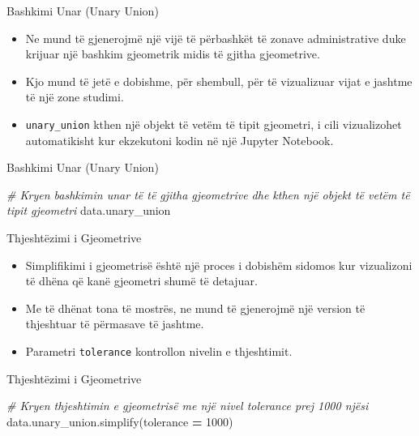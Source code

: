 \documentclass[
  ignorenonframetext,
]{beamer}
\newenvironment{Shaded}{\begin{snugshade}}{\end{snugshade}}
\newcommand{\CommentTok}[1]{\textcolor[rgb]{0.56,0.35,0.01}{\textit{#1}}}
\newcommand{\DecValTok}[1]{\textcolor[rgb]{0.00,0.00,0.81}{#1}}
\newcommand{\NormalTok}[1]{#1}
\newcommand{\OperatorTok}[1]{\textcolor[rgb]{0.81,0.36,0.00}{\textbf{#1}}}
\begin{document}
\begin{frame}[fragile]{Bashkimi Unar (Unary Union)}
\protect\hypertarget{bashkimi-unar-unary-union}{}
\begin{itemize}
\item
  Ne mund të gjenerojmë një vijë të përbashkët të zonave administrative
  duke krijuar një bashkim gjeometrik midis të gjitha gjeometrive.
\item
  Kjo mund të jetë e dobishme, për shembull, për të vizualizuar vijat e
  jashtme të një zone studimi.
\item
  \texttt{unary\_union} kthen një objekt të vetëm të tipit gjeometri, i
  cili vizualizohet automatikisht kur ekzekutoni kodin në një Jupyter
  Notebook.
\end{itemize}
\end{frame}

\begin{frame}[fragile]{Bashkimi Unar (Unary Union)}
\protect\hypertarget{bashkimi-unar-unary-union-1}{}

\begin{Shaded}
\begin{Highlighting}[]
\CommentTok{\# Kryen bashkimin unar të të gjitha gjeometrive dhe kthen një objekt të vetëm të tipit gjeometri}
\NormalTok{data.unary\_union}
\end{Highlighting}
\end{Shaded}
\end{frame}

\begin{frame}[fragile]{Thjeshtëzimi i Gjeometrive}
\protect\hypertarget{thjeshtuxebzimi-i-gjeometrive}{}
\begin{itemize}
\item
  Simplifikimi i gjeometrisë është një proces i dobishëm sidomos kur
  vizualizoni të dhëna që kanë gjeometri shumë të detajuar.
\item
  Me të dhënat tona të mostrës, ne mund të gjenerojmë një version të
  thjeshtuar të përmasave të jashtme.
\item
  Parametri \texttt{tolerance} kontrollon nivelin e thjeshtimit.
\end{itemize}
\end{frame}

\begin{frame}[fragile]{Thjeshtëzimi i Gjeometrive}
\protect\hypertarget{thjeshtuxebzimi-i-gjeometrive-1}{}

\begin{Shaded}
\begin{Highlighting}[]
\CommentTok{\# Kryen thjeshtimin e gjeometrisë me një nivel tolerance prej 1000 njësi}
\NormalTok{data.unary\_union.simplify(tolerance }\OperatorTok{=} \DecValTok{1000}\NormalTok{)}
\end{Highlighting}
\end{Shaded}
\end{frame}
\end{document}
